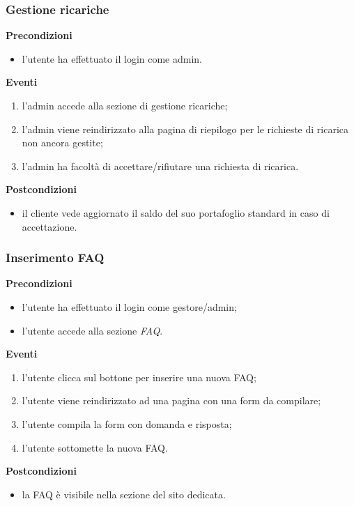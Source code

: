 \documentclass[a4paper, 14pt]{article}
\begin{document}
\begin{flushleft}
			\bigskip
			
			\subsubsection{Gestione ricariche}
			\textbf{Precondizioni}
			\begin{itemize}
				\item l'utente ha effettuato il login come admin.
			\end{itemize}
			\textbf{Eventi}
			\begin{enumerate}
				\item l'admin accede alla sezione di gestione ricariche;
				\item l'admin viene reindirizzato alla pagina di riepilogo per le richieste di ricarica non ancora gestite;
				\item l'admin ha facoltà di accettare/rifiutare una richiesta di ricarica.
			\end{enumerate}
			\textbf{Postcondizioni}
			\begin{itemize}
				\item il cliente vede aggiornato il saldo del suo portafoglio standard in caso di accettazione.
			\end{itemize}
			
			\bigskip
			\subsubsection{Inserimento FAQ}
			\textbf{Precondizioni}
			\begin{itemize}
				\item l'utente ha effettuato il login come gestore/admin;
				\item l'utente accede alla sezione \textit{FAQ}.
			\end{itemize}
			\textbf{Eventi}
			\begin{enumerate}
				\item l'utente clicca sul bottone per inserire una nuova FAQ;
				\item l'utente viene reindirizzato ad una pagina con una form da compilare;
				\item l'utente compila la form con domanda e risposta;
				\item l'utente sottomette la nuova FAQ.
			\end{enumerate}
			\textbf{Postcondizioni}
			\begin{itemize}
				\item la FAQ è visibile nella sezione del sito dedicata.
			\end{itemize}
		

\end{flushleft}
\end{document}
